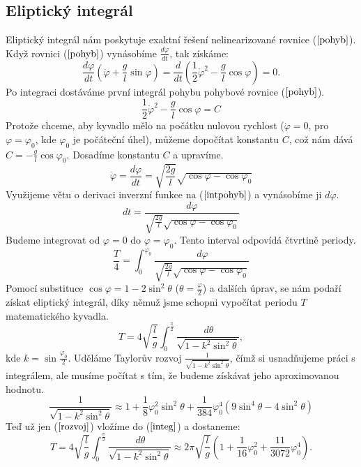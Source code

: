 \subsection{Eliptický integrál}
\label{sec:Eliptický integrál}
Eliptický integrál nám poskytuje exaktní řešení nelinearizované rovnice ($\ref{pohyb}$). Když rovnici ($\ref{pohyb}$) vynásobíme $\frac{d\varphi}{dt}$, tak získáme:
\begin{equation*}
\frac{d\varphi}{dt}\left(\ddot{\varphi}+\frac{g}{l}\sin\varphi\right)=\frac{d}{dt}\left(\frac{1}{2}\dot{\varphi}^2-\frac{g}{l}\cos\varphi\right)=0.
\end{equation*}
Po integraci dostáváme první integrál pohybu pohybové rovnice ($\ref{pohyb}$).
\begin{equation}
\frac{1}{2}\dot{\varphi}^2-\frac{g}{l}\cos\varphi=C
\end{equation}
Protože chceme, aby kyvadlo mělo na počátku nulovou rychlost ($\dot{\varphi}=0$, pro $\varphi=\varphi_0$, kde $\varphi_0$ je počáteční úhel), můžeme dopočítat konstantu $C$, což nám dává $C=-\frac{g}{l}\cos\varphi_0$. Dosadíme konstantu $C$ a upravíme.
\begin{equation}
\label{intpohyb}
\dot{\varphi}=\frac{d\varphi}{dt}=\sqrt{\frac{2g}{l}}\sqrt{\cos\varphi-\cos\varphi_0}
\end{equation}
Využijeme větu o derivaci inverzní funkce na ($\ref{intpohyb}$) a vynásobíme ji $d\varphi$.
\begin{equation}
dt=\frac{d\varphi}{\sqrt{\frac{2g}{l}}\sqrt{\cos\varphi-\cos\varphi_0}}
\end{equation}
Budeme integrovat od $\varphi=0$ do $\varphi=\varphi_0$. Tento interval odpovídá čtvrtině periody.
\begin{equation}
\frac{T}{4}=\int_{0}^{\varphi_0}\frac{\,d\varphi}{\sqrt{\frac{2g}{l}}\sqrt{\cos\varphi-\cos\varphi_0}}
\end{equation}
Pomocí substituce $\cos\varphi=1-2\sin^2\theta$ ($\theta=\frac{\varphi}{2}$) a dalších úprav, se nám podaří získat eliptický integrál, díky němuž jsme schopni vypočítat periodu $T$ matematického kyvadla.
\begin{equation}
\label{integ}
T=4\sqrt{\frac{l}{g}}\int_{0}^{\frac{\pi}{2}}\frac{\,d\theta}{\sqrt{1-k^2\sin^2\theta}},
\end{equation}
kde $k=\sin\frac{\varphi_0}{2}$.
Uděláme Taylorův rozvoj $\frac{1}{\sqrt{1-k^2\sin^2\theta}}$, čímž si usnadňujeme práci s integrálem, ale musíme počítat s tím, že budeme získávat jeho aproximovanou hodnotu.
\begin{equation}
\label{rozvoj}
\frac{1}{\sqrt{1-k^2\sin^2\theta}}\approx1+\frac{1}{8} \varphi_0 ^2 \sin ^2\theta+\frac{1}{384} \varphi_0 ^4 \left(9 \sin ^4\theta-4 \sin
   ^2\theta \right)
\end{equation}
Teď už jen ($\ref{rozvoj}$) vložíme do ($\ref{integ}$) a dostaneme:
\begin{equation}
T=4\sqrt{\frac{l}{g}}\int_{0}^{\frac{\pi}{2}}\frac{\,d\theta}{\sqrt{1-k^2\sin^2\theta}}\approx2\pi\sqrt{\frac{l}{g}}\left(1+\frac{1}{16}\varphi_0^2+\frac{11}{3072}\varphi_0^4\right).
\end{equation}

